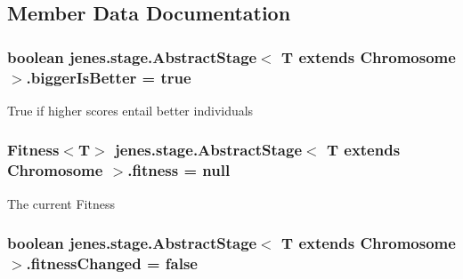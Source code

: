 \subsection{Member Data Documentation}
\hypertarget{classjenes_1_1stage_1_1_abstract_stage_3_01_t_01extends_01_chromosome_01_4_a11da35af3fe950eef9882b03e13690d4}{
\subsubsection[{bigger\-Is\-Better}]{\setlength{\rightskip}{0pt plus 5cm}boolean jenes.\-stage.\-Abstract\-Stage$<$ T extends Chromosome $>$.bigger\-Is\-Better = true\hspace{0.3cm}{\ttfamily [protected]}}}\label{classjenes_1_1stage_1_1_abstract_stage_3_01_t_01extends_01_chromosome_01_4_a11da35af3fe950eef9882b03e13690d4}
True if higher scores entail better individuals \hypertarget{classjenes_1_1stage_1_1_abstract_stage_3_01_t_01extends_01_chromosome_01_4_a697ab8239c1ae2a99445cd7f5fbca45d}{
\subsubsection[{fitness}]{\setlength{\rightskip}{0pt plus 5cm}Fitness$<$T$>$ jenes.\-stage.\-Abstract\-Stage$<$ T extends Chromosome $>$.fitness = null\hspace{0.3cm}{\ttfamily [protected]}}}\label{classjenes_1_1stage_1_1_abstract_stage_3_01_t_01extends_01_chromosome_01_4_a697ab8239c1ae2a99445cd7f5fbca45d}
The current Fitness \hypertarget{classjenes_1_1stage_1_1_abstract_stage_3_01_t_01extends_01_chromosome_01_4_a049a743a79ce2e6d2a4243f85226a59e}{
\subsubsection[{fitness\-Changed}]{\setlength{\rightskip}{0pt plus 5cm}boolean jenes.\-stage.\-Abstract\-Stage$<$ T extends Chromosome $>$.fitness\-Changed = false\hspace{0.3cm}{\ttfamily [private]}}}\label{classjenes_1_1stage_1_1_abstract_stage_3_01_t_01extends_01_chromosome_01_4_a049a743a79ce2e6d2a4243f85226a59e}
